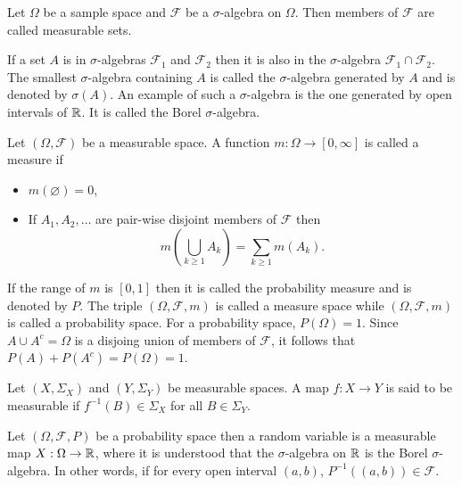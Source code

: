 \documentclass{article}
\begin{document}
\begin{defn}\label{c2d1}
Let $\Omega$ be a sample space and $\mathcal{F}$ be a $\sigma$-algebra on $\Omega$.
Then members of $\mathcal{F}$ are called measurable sets.
\end{defn}

If a set $A$ is in $\sigma$-algebras $\mathcal{F}_1$ and $\mathcal{F}_2$ then it
is also in the $\sigma$-algebra $\mathcal{F}_1 \cap \mathcal{F}_2$. The smallest
$\sigma$-algebra containing $A$ is called the $\sigma$-algebra generated by $A$
and is denoted by $\sigma(A)$. An example of such a $\sigma$-algebra is the one
generated by open intervals of $\mathbb{R}$. It is called the Borel $\sigma$-algebra.

\begin{defn}\label{c2d2}
Let $(\Omega, \mathcal{F})$ be a measurable space. A function $m:\Omega\rightarrow
[0, \infty]$ is called a measure if
\begin{itemize}
\item $m(\varnothing) = 0$,
\item If $A_1, A_2, \ldots$ are pair-wise disjoint members of $\mathcal{F}$ then
\[
m\left(\bigcup_{k \ge 1}A_k\right) = \sum_{k \ge 1}m(A_k).
\]
\end{itemize}
\end{defn}
If the range of $m$ is $[0, 1]$ then it is called the probability measure and is
denoted by $P$. The triple $(\Omega, \mathcal{F}, m)$ is called a measure space
while $(\Omega, \mathcal{F}, m)$ is called a probability space. For a probability
space, $P(\Omega) = 1$. Since  $A \cup A^c = \Omega$ is a disjoing union of 
members of $\mathcal{F}$, it follows that $P(A) + P(A^c) = P(\Omega) = 1$.

\begin{defn}\label{c2d3}
Let $(X, \Sigma_X)$ and $(Y, \Sigma_Y)$ be measurable spaces. A map $f: X 
\rightarrow Y$ is said to be measurable if $f^{-1}(B) \in \Sigma_X$ for all
$B \in \Sigma_Y$.
\end{defn}

\begin{defn}\label{c2d4}
Let $(\Omega, \mathcal{F}, P)$ be a probability space then a random variable
is a measurable map $X: \Omega \rightarrow \mathbb{R}$, where it is understood that
the $\sigma$-algebra on $\mathbb{R}$ is the Borel $\sigma$-algebra. In other words,
if for every open interval $(a, b)$, $P^{-1}((a, b)) \in \mathcal{F}$.
\end{defn}
\end{document}
